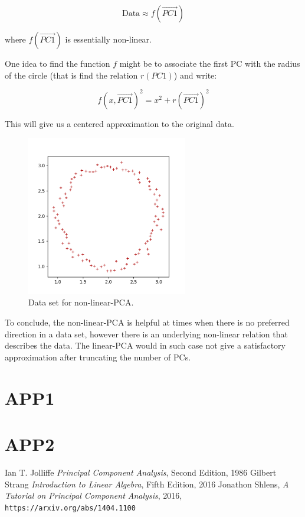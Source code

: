 \documentclass[10pt,twocolumn]{article}
\begin{document}
\begin{equation}
\text{Data} \approx f(\vec{PC1})
\end{equation}

where $f(\vec{PC1})$ is essentially non-linear.

One idea to find the function $f$ might be to associate the first PC with the radius of the circle (that is find the relation $r(PC1)$) and write:

\begin{equation}
f(x, \vec{PC1})^2 = x^2 + r(\vec{PC1})^2
\end{equation}

This will give us a centered approximation to the original data. 

\begin{figure}[H]
\centering\includegraphics[width=7cm]{../python/PCA-fake-datasets/PCA_nonlinear_scatter_2.png}
\caption{Data set for non-linear-PCA.}			
\label{fig:nonlinear_PCA_data}
\end{figure}

To conclude, the non-linear-PCA is helpful at times when there is no preferred direction in a data set, however there is an underlying non-linear relation that describes the data. The linear-PCA would in such case not give a satisfactory approximation after truncating the number of PCs. 




\appendix

\section{APP1} \label{app:A}

\section{APP2} \label{app:B}

\thebibliography{}

 Ian T. Jolliffe \textit{Principal Component Analysis}, Second Edition, 1986
 Gilbert Strang \textit{Introduction to Linear Algebra}, Fifth Edition, 2016
 Jonathon Shlens, \textit{A Tutorial on Principal Component Analysis}, 2016, \texttt{https://arxiv.org/abs/1404.1100}

 \label{bib:pope}
\end{document}
